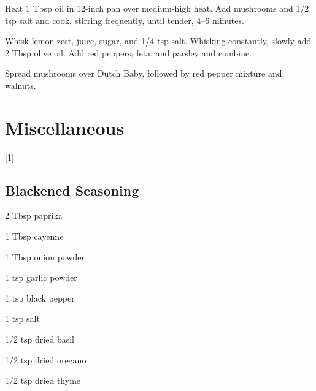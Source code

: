 \documentclass[oneside]{book}  %
\def\thisrecipe{}  %
\newcommand{\chapterrec}[1]{  %
  \newpage \def\thisrecipe{} \chapter{#1} \vspace{1.1em}
}
\newcommand{\chaptertoc}[1]{  %
  \chapterrec{#1} \vspace{-1.1em}  %
  \startcontents[chapters] \printcontents[chapters]{chapter_toc_}{1}[1]{}
}
\newcommand{\recipe}[1]{\section{#1}\def\thisrecipe{: #1}} %
\begin{document}
\begin{twocols}
  \begin{directions1col}
    \item Heat 1 Tbsp oil in 12-inch pan over medium-high heat. Add mushrooms
    and 1/2 tsp salt and cook, stirring frequently, until tender, 4--6 minutes.

    \item Whisk lemon zest, juice, sugar, and 1/4 tsp salt. Whisking constantly,
    slowly add 2 Tbsp olive oil. Add red peppers, feta, and parsley and combine.

    \item Spread mushrooms over Dutch Baby, followed by red pepper mixture and
    walnuts.
  \end{directions1col}
\end{twocols}

\chaptertoc{Miscellaneous} \label{chap:miscellaneous}
\recipe{Blackened Seasoning} \label{recipe:blackened_seasoning} %

\begin{ingredients}
  \item[2 Tbsp] paprika
  \item[1 Tbsp] cayenne
  \item[1 Tbsp] onion powder
  \item[1 tsp] garlic powder
  \item[1 tsp] black pepper
  \item[1 tsp] salt
  \item[1/2 tsp] dried basil
  \item[1/2 tsp] dried oregano
  \item[1/2 tsp] dried thyme
\end{ingredients}
\end{document}
